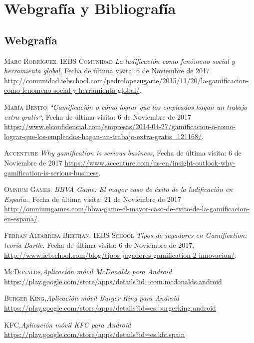 \documentclass[twoside]{report}
\begin{document}
\chapter{Webgrafía y Bibliografía}

\begin{thebibliography}{a} 
\section{Webgrafía}

 \textsc{Marc Rodríguez. IEBS Comunidad} \textit{La ludificación como fenómeno social y herramienta global}, Fecha de última visita: 6 de Noviembre de 2017 \url{http://comunidad.iebschool.com/pedrolopezugarte/2015/11/20/la-gamificacion-como-fenomeno-social-y-herramienta-global/}.  

 \textsc{María Benito} \textit{“Gamificación o cómo lograr que los empleados hagan un trabajo extra gratis“}, Fecha de última visita: 6 de Noviembre de 2017 \url{https://www.elconfidencial.com/empresas/2014-04-27/gamificacion-o-como-lograr-que-los-empleados-hagan-un-trabajo-extra-gratis_121168/}. 

 \textsc{Accenture} \textit{Why gamification is serious business}, Fecha de última visita: 6 de Noviembre de 2017 \url{https://www.accenture.com/us-en/insight-outlook-why-gamification-is-serious-business}.  

 \textsc{Omnium Games.} \textit{BBVA Game: El mayor caso de éxito de la ludificación en España.}, Fecha de última visita: 21 de Noviembre de 2017 \url{http://omniumgames.com/bbva-game-el-mayor-caso-de-exito-de-la-gamificacion-en-espana/}.  

 \textsc{Ferran Altarriba Bertran. IEBS School} \textit{Tipos de jugadores en Gamification: teoría Bartle}. Fecha de última visita: 6 de Noviembre de 2017, \url{http://www.iebschool.com/blog/tipos-jugadores-gamification-2-innovacion/}.  

 \textsc{McDonalds},\textit{Aplicación móvil McDonalds para Android} \url{https://play.google.com/store/apps/details?id=com.mcdonalds.android}

 \textsc{Burger King},\textit{Aplicación móvil Burger King para Android} \url{https://play.google.com/store/apps/details?id=es.burgerking.android}

 \textsc{KFC},\textit{Aplicación móvil KFC para Android} \url{https://play.google.com/store/apps/details?id=es.kfc.spain}


\end{thebibliography}
\end{document}
